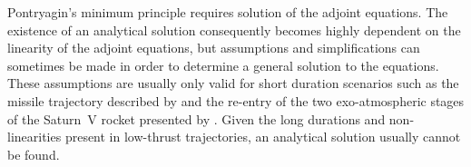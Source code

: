 

Pontryagin's minimum principle requires solution of the adjoint equations. %
The existence of an analytical solution consequently becomes highly dependent on the linearity of the adjoint equations, but assumptions and simplifications can sometimes be made in order to determine a general solution to the equations. These assumptions are usually only valid for short duration scenarios such as the missile trajectory described by \textcite{Ohlmeyer2006} and the re-entry of the two exo-atmospheric stages of the Saturn~V rocket presented by \textcite{Haeussermann1965}. Given the long durations and non-linearities present in low-thrust trajectories, an analytical solution usually cannot be found.

